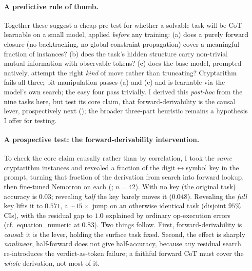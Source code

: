 \documentclass[11pt]{article}
\begin{document}
\paragraph{A predictive rule of thumb.} Together these suggest a cheap pre-test for whether a
solvable task will be CoT-learnable on a small model, applied \emph{before} any training:
(a) does a purely forward closure (no backtracking, no global constraint propagation) cover a
meaningful fraction of instances? (b) does the task's hidden structure carry non-trivial
mutual information with observable tokens? (c) does the base model, prompted natively,
attempt the right \emph{kind} of move rather than truncating? Cryptarithm fails all three;
bit-manipulation passes (a) and (c) and is learnable via the model's own search; the easy
four pass trivially. I derived this \emph{post-hoc} from the nine tasks here, but test its core claim, that
forward-derivability is the causal lever, prospectively next (); the broader
three-part heuristic remains a hypothesis I offer for testing.

\paragraph{A prospective test: the forward-derivability intervention.} To check the core claim
causally rather than by correlation, I took the \emph{same} cryptarithm instances and revealed
a fraction of the digit$\leftrightarrow$symbol key in the prompt, turning that fraction of the
derivation from search into forward lookup, then fine-tuned Nemotron on each (;
$n{=}42$). With no key (the original task) accuracy is $0.03$; revealing \emph{half} the key
barely moves it ($0.048$). Revealing the \emph{full} key lifts it to $\mathbf{0.571}$, a
$\sim\!15\times$ jump on an otherwise identical task (disjoint $95\%$ CIs), with the residual gap
to $1.0$ explained by ordinary op-execution errors (cf.\ equation\_numeric at $0.83$). Two things
follow. First, forward-derivability is \emph{causal}: it is the lever, holding the surface task
fixed. Second, the effect is sharply \emph{nonlinear}, half-forward does not give half-accuracy,
because any residual search re-introduces the verdict-as-token failure; a faithful forward CoT
must cover the \emph{whole} derivation, not most of it.
\end{document}
